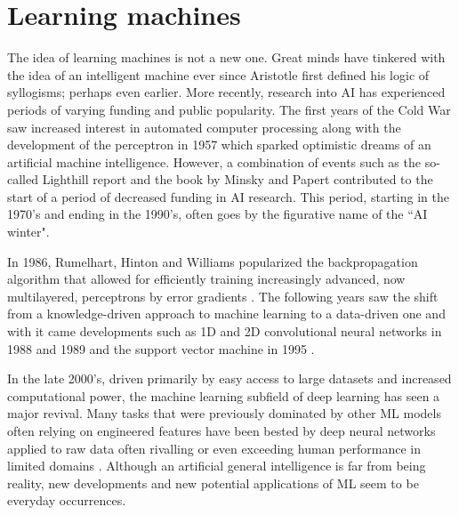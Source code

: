 
\section{Learning machines}
The idea of learning machines is not a new one. Great minds have tinkered with the idea of an intelligent machine ever since Aristotle first defined his logic of syllogisms; perhaps even earlier. More recently, research into \gls{AI} has experienced periods of varying funding and public popularity. The first years of the Cold War saw increased interest in automated computer processing along with the development of the perceptron \cite{Rosenblatt1957} in 1957 which sparked optimistic dreams of an artificial machine intelligence. However, a combination of events such as the so-called Lighthill report \cite{Lighthill1973} and the book by Minsky and Papert \cite{Minsky1969} contributed to the start of a period of decreased funding in \gls{AI} research. This period, starting in the 1970's and ending in the 1990's, often goes by the figurative name of the ``AI winter".

In 1986, Rumelhart, Hinton and Williams popularized the backpropagation algorithm that allowed for efficiently training increasingly advanced, now multilayered, perceptrons by error gradients \cite{Rumelhart1986}. The following years saw the shift from a knowledge-driven approach to machine learning to a data-driven one and with it came developments such as 1D and 2D convolutional neural networks in 1988 and 1989 \cite{Hinton1988, LeCun1989} and the support vector machine in 1995 \cite{Cortes1995}.

In the late 2000's, driven primarily by easy access to large datasets and increased computational power, the machine learning subfield of deep learning has seen a major revival.
Many tasks that were previously dominated by other \gls{ML} models often relying on engineered features have been bested by deep neural networks applied to raw data often rivalling or even exceeding human performance in limited domains \cite{Schmidhuber2014}. Although an artificial general intelligence is far from being reality, new developments and new potential applications of \gls{ML} seem to be everyday occurrences.

